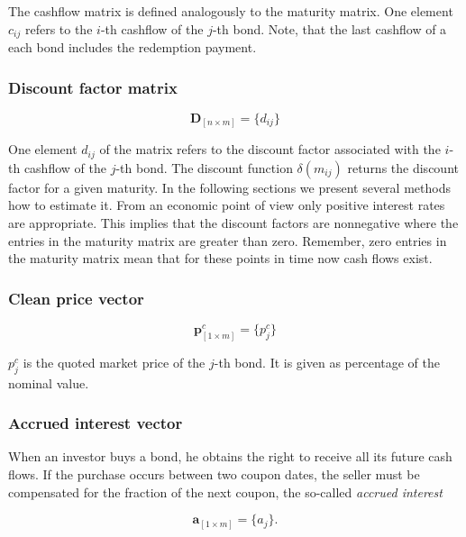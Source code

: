 The cashflow matrix is defined analogously to the maturity matrix. One element $c_{ij}$ refers to the $i$-th cashflow of the $j$-th bond. Note, that the last cashflow of a each bond includes the redemption payment.

\subsubsection*{Discount factor matrix}

 \begin{equation*}\label{discountm}
\bm{D}_{\left[n\times m\right]}= \{d_{ij}\}
\end{equation*}

One element $d_{ij}$ of the matrix refers to the discount factor associated with the $i$-th cashflow of the $j$-th bond. The discount function $\delta(m_{ij})$ returns the discount factor for a given maturity. In the following sections we present several methods how to estimate it. From an economic point of view only positive interest rates are appropriate. This implies that the discount factors are nonnegative where the entries in the maturity matrix are greater than zero. Remember, zero entries in the maturity matrix mean that for these points in time now cash flows exist.

\subsubsection*{Clean price vector}

 \begin{equation*}\label{pc}
\bm{p}^c_{\left[1\times m\right]}= \{p^c_j\}
\end{equation*}

$p_{j}^c$ is the quoted market price of the $j$-th bond. It is given as percentage of the nominal value.

\subsubsection*{Accrued interest vector}

When an investor buys a bond, he obtains the right to receive all its future cash flows. If the purchase occurs between two coupon dates, the seller must be compensated for the fraction of the next coupon, the so-called \emph{accrued interest}

  \begin{equation*}\label{a}
\bm{a}_{\left[1\times m\right]}= \{a_j\}.
\end{equation*}


